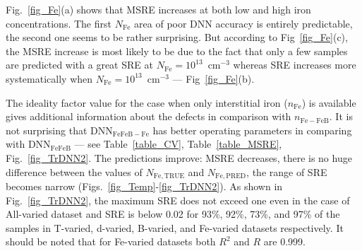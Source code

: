 \documentclass[num-refs]{wiley-article} %
\begin{document}
Fig.~\ref{fig_Fe}(a) shows that MSRE increases at both low and high iron concentrations.
The first $N_\mathrm{Fe}$ area of poor DNN accuracy is entirely predictable,
the second one seems to be rather surprising.
But according to Fig~\ref{fig_Fe}(c), the MSRE increase is most likely to be due to the fact
that only a few samples are predicted with a great SRE
at $N_\mathrm{Fe}=10^{13}$~cm$^{-3}$
whereas SRE increases more systematically when $N_\mathrm{Fe}=10^{13}$~cm$^{-3}$ --- Fig~\ref{fig_Fe}(b).

The ideality factor value for the case when only interstitial iron ($n_\mathrm{Fe}$)
is available gives additional information about the defects in comparison with $n_\mathrm{Fe-FeB}$.
It is not surprising that DNN$_\mathrm{FeFeB-Fe}$ has better operating parameters in comparing with
DNN$_\mathrm{FeFeB}$ --- see Table~\ref{table_CV}, Table~\ref{table_MSRE}, Fig.~\ref{fig_TrDNN2}.
The predictions improve:
MSRE decreases,
there is no huge difference between the values of $N_\mathrm{Fe,TRUE}$ and $N_\mathrm{Fe,PRED}$,
the range of SRE becomes  narrow
(Figs.~\ref{fig_Temp}-\ref{fig_TrDNN2}).
As shown in Fig.~\ref{fig_TrDNN2}, the maximum SRE does not exceed one even in the case of All-varied dataset
and SRE is below 0.02 for 93\%, 92\%, 73\%, and 97\% of the samples in T-varied, d-varied, B-varied, and Fe-varied datasets respectively.
It should be noted that  for Fe-varied datasets both $R^2$ and  $R$  are 0.999.
\end{document}
